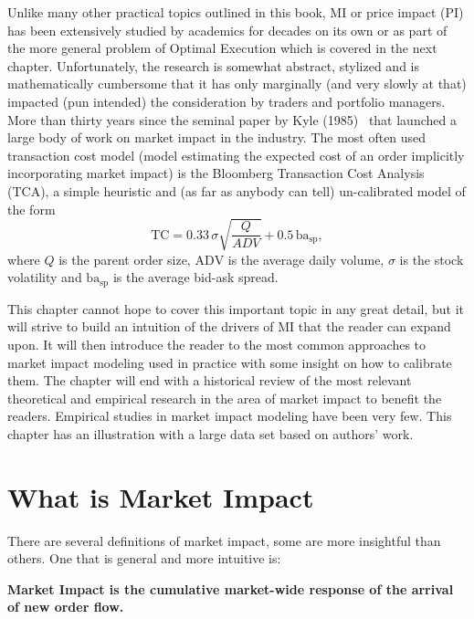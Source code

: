 Unlike many other practical topics outlined in this book, MI or price impact (PI) has been extensively studied by academics for decades on its own or as part of the more general problem of Optimal Execution which is covered in the next chapter. Unfortunately, the research is somewhat abstract, stylized and is mathematically cumbersome that it has only marginally (and very slowly at that) impacted (pun intended) the consideration by traders and portfolio managers. More than thirty years since the seminal paper by Kyle (1985)~\cite{kyle1985} that launched a large body of work on market impact in the industry. The most often used transaction cost model (model estimating the expected cost of an order implicitly incorporating market impact) is the Bloomberg Transaction Cost Analysis (TCA), a simple heuristic and (as far as anybody can tell) un-calibrated model of the form
        \begin{equation} \label{eq:bb_tca}
        \text{TC} = 0.33\, \sigma \sqrt{\frac{Q}{ADV}} + 0.5 \,\text{ba}_{\text{sp}},
        \end{equation}
where $Q$ is the parent order size, $\text{ADV}$ is the average daily volume, $\sigma$ is the stock volatility and $\text{ba}_{\text{sp}}$ is the average bid-ask spread. 


This chapter cannot hope to cover this important topic in any great detail, but it will strive to build an intuition of the drivers of MI that the reader can expand upon. It will then introduce the reader to the most common approaches to market impact modeling used in practice with some insight on how to calibrate them. The chapter will end with a historical review of the most relevant theoretical and empirical research in the area of market impact to benefit the readers. Empirical studies in market impact modeling have been very few. This chapter has an illustration with a large data set based on authors' work. 



\section{What is Market Impact\label{sec:what_market_impact}}

There are several definitions of market impact, some are more insightful than others. One that is general and more intuitive is:
        \begin{displayquote}
        \textbf{Market Impact is the cumulative market-wide response of the arrival  of new order flow.}
        \end{displayquote}


